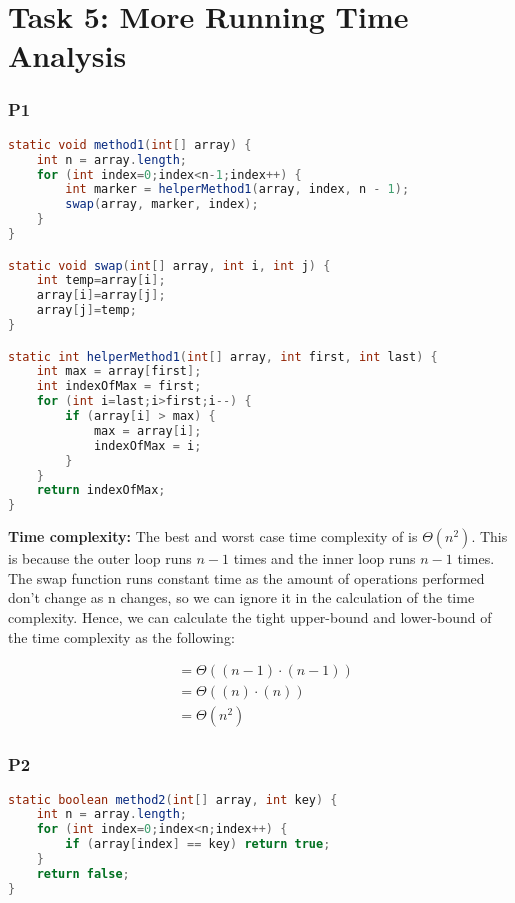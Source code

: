  \chapter{Task 5: More Running Time Analysis}

\subsection*{P1}
\begin{lstlisting}[language=Java]
static void method1(int[] array) {
    int n = array.length;
    for (int index=0;index<n-1;index++) {
        int marker = helperMethod1(array, index, n - 1);
        swap(array, marker, index);
    }
}

static void swap(int[] array, int i, int j) {
    int temp=array[i];
    array[i]=array[j];
    array[j]=temp;
}

static int helperMethod1(int[] array, int first, int last) {
    int max = array[first];
    int indexOfMax = first;
    for (int i=last;i>first;i--) {
        if (array[i] > max) {
            max = array[i];
            indexOfMax = i;
        }
    }
    return indexOfMax;
}
\end{lstlisting}

\textbf{Time complexity:} 
The best and worst case time complexity of  is $\Theta(n^2)$. This is because the outer loop runs $n-1$ times and the inner loop runs $n-1$ times. The swap function runs constant time as the amount of operations performed don't change as n changes, so we can ignore it in the calculation of the time complexity. Hence, we can calculate the tight upper-bound and lower-bound of the time complexity as the following:

\begin{align*}
  &= \Theta((n-1)\cdot(n-1))\\  
  &= \Theta((n)\cdot(n))\\  
  &= \Theta(n^2)  
\end{align*}




\pagebreak

\subsection*{P2}

\begin{lstlisting}[language=Java]
static boolean method2(int[] array, int key) {
    int n = array.length;
    for (int index=0;index<n;index++) {
        if (array[index] == key) return true;
    }
    return false;
}
\end{lstlisting}
\vspace*{4pt}

